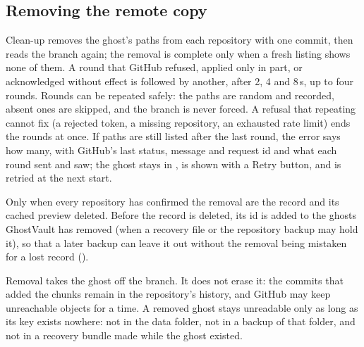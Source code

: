 \subsection{Removing the remote copy}
Clean-up removes the ghost's paths from each repository with one commit, then reads the branch again;
the removal is complete only when a fresh listing shows none of them. A round that GitHub refused,
applied only in part, or acknowledged without effect is followed by another, after 2, 4 and 8\,s,
up to four rounds. Rounds can be repeated safely: the paths are random and recorded, absent ones are
skipped, and the branch is never forced. A refusal that repeating cannot fix (a rejected token, a
missing repository, an exhausted rate limit) ends the rounds at once. If paths are still listed after
the last round, the error says how many, with GitHub's last status, message and request id and what
each round sent and saw; the ghost stays in , is shown with a Retry button, and is
retried at the next start.

Only when every repository has confirmed the removal are the record and its cached preview deleted.
Before the record is deleted, its id is added to the ghosts GhostVault has removed (when a recovery
file or the repository backup may hold it), so that a later backup can leave it out without the
removal being mistaken for a lost record ().

Removal takes the ghost off the branch. It does not erase it: the commits that added the chunks
remain in the repository's history, and GitHub may keep unreachable objects for a time. A removed
ghost stays unreadable only as long as its key exists nowhere: not in the data folder, not in a
backup of that folder, and not in a recovery bundle made while the ghost existed.
